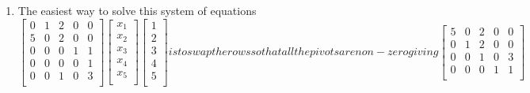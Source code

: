 \begin{enumerate}[label=(\alph*)]
    \item The easiest way to solve this system of equations 
        \begin{subequations}
            \begin{equation}
                \begin{bmatrix}
                    0       &   1       &   2   &   0   &   0   \\
                    5       &   0       &   2   &   0   &   0   \\
                    0       &   0       &   0   &   1   &   1   \\
                    0       &   0       &   0   &   0   &   1   \\
                    0       &   0       &   1   &   0   &   3   \\
                \end{bmatrix}
                \begin{bmatrix}
                    x_{1}   \\
                    x_{2}   \\
                    x_{3}   \\
                    x_{4}   \\
                    x_{5}   \\
                \end{bmatrix}
                \begin{bmatrix}
                    1       \\
                    2       \\
                    3       \\
                    4       \\
                    5       \\
                \end{bmatrix}
            \end{equation}
        is to swap the rows so that all the pivots  
        are non-zero giving 
            \begin{equation}
                \begin{bmatrix}
                    5       &   0       &   2   &   0   &   0   \\
                    0       &   1       &   2   &   0   &   0   \\
                    0       &   0       &   1   &   0   &   3   \\
                    0       &   0       &   0   &   1   &   1   \\

\end{bmatrix}
\end{equation}
\end{subequations}
\end{enumerate}

